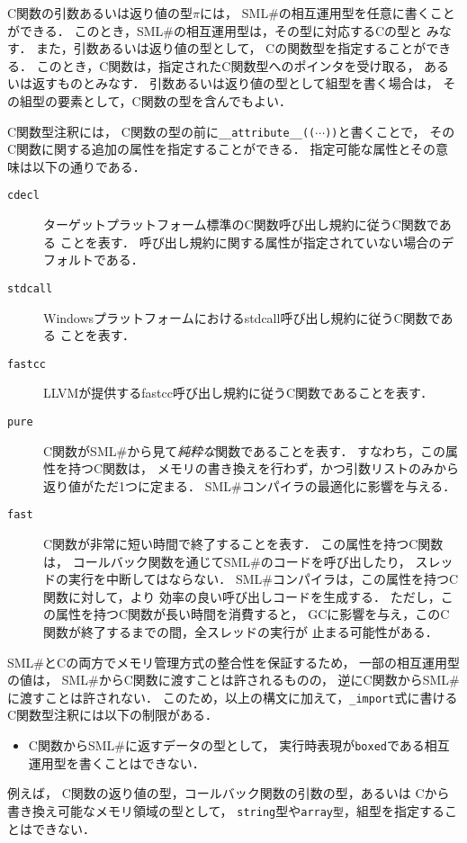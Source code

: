 \documentclass{jbook}
\newcommand{\smlsharp}{SML\#}
\begin{document}
	C関数の引数あるいは返り値の型$\pi$には，
\smlsharp{}の相互運用型を任意に書くことができる．
	このとき，\smlsharp{}の相互運用型は，その型に対応するCの型と
みなす．
	また，引数あるいは返り値の型として，
Cの関数型を指定することができる．
	このとき，C関数は，指定されたC関数型へのポインタを受け取る，
あるいは返すものとみなす．
	引数あるいは返り値の型として組型を書く場合は，
その組型の要素として，C関数の型を含んでもよい．

	C関数型注釈には，
C関数の型の前に{\tt \_\_attribute\_\_(($\cdots$))}と書くことで，
そのC関数に関する追加の属性を指定することができる．
	指定可能な属性とその意味は以下の通りである．
\begin{description}
\item[{\tt cdecl}]
	ターゲットプラットフォーム標準のC関数呼び出し規約に従うC関数である
ことを表す．
	呼び出し規約に関する属性が指定されていない場合のデフォルトである．
\item[{\tt stdcall}]
	Windowsプラットフォームにおけるstdcall呼び出し規約に従うC関数である
ことを表す．
\item[{\tt fastcc}]
	LLVMが提供するfastcc呼び出し規約に従うC関数であることを表す．
\item[{\tt pure}]
	C関数が\smlsharp{}から見て{\em 純粋な}関数であることを表す．
	すなわち，この属性を持つC関数は，
メモリの書き換えを行わず，かつ引数リストのみから返り値がただ1つに定まる．
	\smlsharp{}コンパイラの最適化に影響を与える．
\item[{\tt fast}]
	C関数が非常に短い時間で終了することを表す．
	この属性を持つC関数は，
コールバック関数を通じて\smlsharp{}のコードを呼び出したり，
スレッドの実行を中断してはならない．
	\smlsharp{}コンパイラは，この属性を持つC関数に対して，より
効率の良い呼び出しコードを生成する．
	ただし，この属性を持つC関数が長い時間を消費すると，
GCに影響を与え，このC関数が終了するまでの間，全スレッドの実行が
止まる可能性がある．
\end{description}

	\smlsharp{}とCの両方でメモリ管理方式の整合性を保証するため，
一部の相互運用型の値は，
\smlsharp{}からC関数に渡すことは許されるものの，
逆にC関数から\smlsharp{}に渡すことは許されない．
	このため，以上の構文に加えて，{\tt \_import}式に書ける
C関数型注釈には以下の制限がある．
\begin{itemize}
\item
	C関数から\smlsharp{}に返すデータの型として，
実行時表現が{\tt boxed}である相互運用型を書くことはできない．
\end{itemize}
	例えば，
C関数の返り値の型，コールバック関数の引数の型，あるいは
Cから書き換え可能なメモリ領域の型として，
{\tt string}型や{\tt array型}，組型を指定することはできない．
\end{document}
